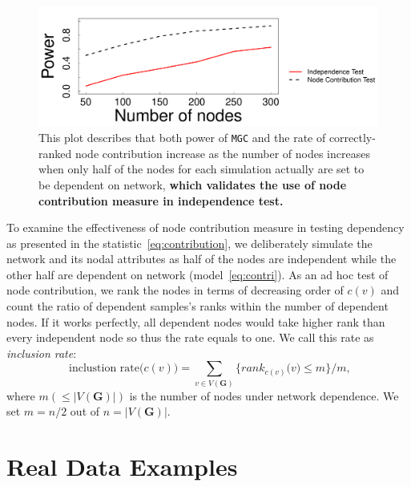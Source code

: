 \documentclass[12pt]{article}
\theoremstyle{definition}
\begin{document}
\begin{figure}[h]
	\centering
	\includegraphics[width=\linewidth]{../Figure/nodecontri.pdf}
	\caption{This plot describes that both power of \texttt{MGC} and the rate of correctly-ranked node contribution increase as the number of nodes increases when only half of the nodes for each simulation actually are set to be dependent on network, \textbf{which validates the use of node contribution measure in independence test.}}
	\label{fig:contribution}
\end{figure}
To examine the effectiveness of node contribution measure in testing dependency as presented in the statistic~\ref{eq:contribution}, we deliberately simulate the network and its nodal attributes as half of the nodes are independent while the other half are dependent on network (model~\ref{eq:contri}). As an ad hoc test of node contribution, we rank the nodes in terms of decreasing order of $c(v)$ and count the ratio of dependent samples's ranks within the number of dependent nodes. If it works perfectly, all dependent nodes would take higher rank than every independent node so thus the rate equals to one. We call this rate as \textit{inclusion rate}:
\begin{equation}
\mbox{ inclustion rate}\big(  c(v) \big) = \sum\limits_{v \in V(\mathbf{G})} \big\{  rank_{c(v)}\big(  v \big)  \leq  m  \big\}   /  m,
\label{eq:inclusion_rate}
\end{equation}
where $m (\leq |V(\mathbf{G})|)$ is the number of nodes under network dependence. We set $m=n/2$ out of $n = |V(\mathbf{G})|$.

\section{Real Data Examples}
\label{sec:real}
\end{document}
